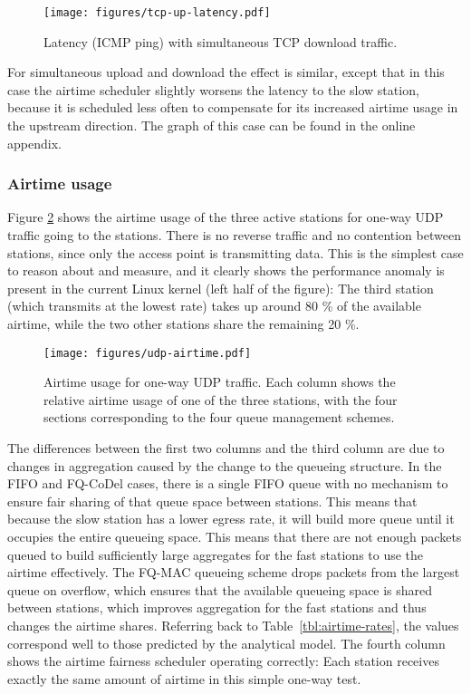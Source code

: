 \documentclass[english]{scrartcl}
\begin{document}
\begin{figure}[htbp]
\centering
\texttt{[image: figures/tcp-up-latency.pdf]}
\caption{\label{fig:tcp-up-latency}
Latency (ICMP ping) with simultaneous TCP download traffic.}
\end{figure}

For simultaneous upload and download the effect is similar, except that in this
case the airtime scheduler slightly worsens the latency to the slow station,
because it is scheduled less often to compensate for its increased airtime usage
in the upstream direction. The graph of this case can be found in the online
appendix.

\subsubsection{Airtime usage}
\label{sec:org4903cc4}
Figure \ref{fig:airtime-udp} shows the airtime usage of the three active stations for
one-way UDP traffic going to the stations. There is no reverse traffic and no
contention between stations, since only the access point is transmitting data.
This is the simplest case to reason about and measure, and it clearly shows the
performance anomaly is present in the current Linux kernel (left half of the
figure): The third station (which transmits at the lowest rate) takes up around
80 \% of the available airtime, while the two other stations share the remaining
20 \%.

\begin{figure}[htbp]
\centering
\texttt{[image: figures/udp-airtime.pdf]}
\caption{\label{fig:airtime-udp}
Airtime usage for one-way UDP traffic. Each column shows the relative airtime usage of one of the three stations, with the four sections corresponding to the four queue management schemes.}
\end{figure}

The differences between the first two columns and the third column are due to
changes in aggregation caused by the change to the queueing structure. In the
FIFO and FQ-CoDel cases, there is a single FIFO queue with no mechanism to
ensure fair sharing of that queue space between stations. This means that
because the slow station has a lower egress rate, it will build more queue until
it occupies the entire queueing space. This means that there are not enough
packets queued to build sufficiently large aggregates for the fast stations to
use the airtime effectively. The FQ-MAC queueing scheme drops packets from the
largest queue on overflow, which ensures that the available queueing space is
shared between stations, which improves aggregation for the fast stations and
thus changes the airtime shares. Referring back to
Table \ref{tbl:airtime-rates}, the values correspond well to those predicted by
the analytical model. The fourth column shows the airtime fairness scheduler
operating correctly: Each station receives exactly the same amount of airtime in
this simple one-way test.
\end{document}
